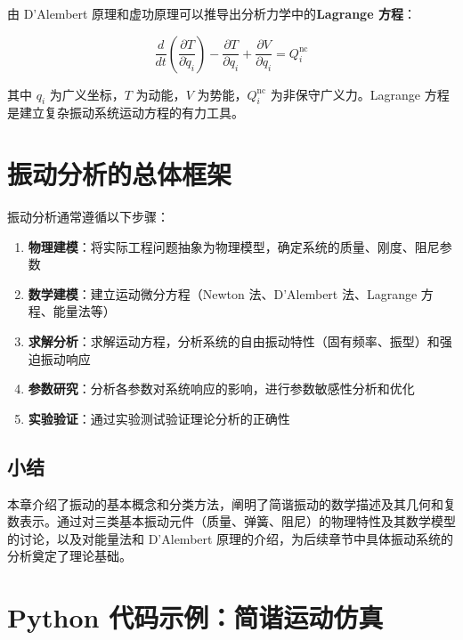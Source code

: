 由 D'Alembert 原理和虚功原理可以推导出分析力学中的\textbf{Lagrange 方程}：
\begin{myformula}
    \[
    \frac{d}{dt}\left(\frac{\partial T}{\partial \dot{q}_i}\right) - \frac{\partial T}{\partial q_i} + \frac{\partial V}{\partial q_i} = Q_i^{\text{nc}}
    \]
\end{myformula}
其中 $q_i$ 为广义坐标，$T$ 为动能，$V$ 为势能，$Q_i^{\text{nc}}$ 为非保守广义力。Lagrange 方程是建立复杂振动系统运动方程的有力工具。

\section{振动分析的总体框架}

振动分析通常遵循以下步骤：
\begin{enumerate}
    \item \textbf{物理建模}：将实际工程问题抽象为物理模型，确定系统的质量、刚度、阻尼参数
    \item \textbf{数学建模}：建立运动微分方程（Newton 法、D'Alembert 法、Lagrange 方程、能量法等）
    \item \textbf{求解分析}：求解运动方程，分析系统的自由振动特性（固有频率、振型）和强迫振动响应
    \item \textbf{参数研究}：分析各参数对系统响应的影响，进行参数敏感性分析和优化
    \item \textbf{实验验证}：通过实验测试验证理论分析的正确性
\end{enumerate}

\subsection{小结}

本章介绍了振动的基本概念和分类方法，阐明了简谐振动的数学描述及其几何和复数表示。通过对三类基本振动元件（质量、弹簧、阻尼）的物理特性及其数学模型的讨论，以及对能量法和 D'Alembert 原理的介绍，为后续章节中具体振动系统的分析奠定了理论基础。

\section{Python 代码示例：简谐运动仿真}

